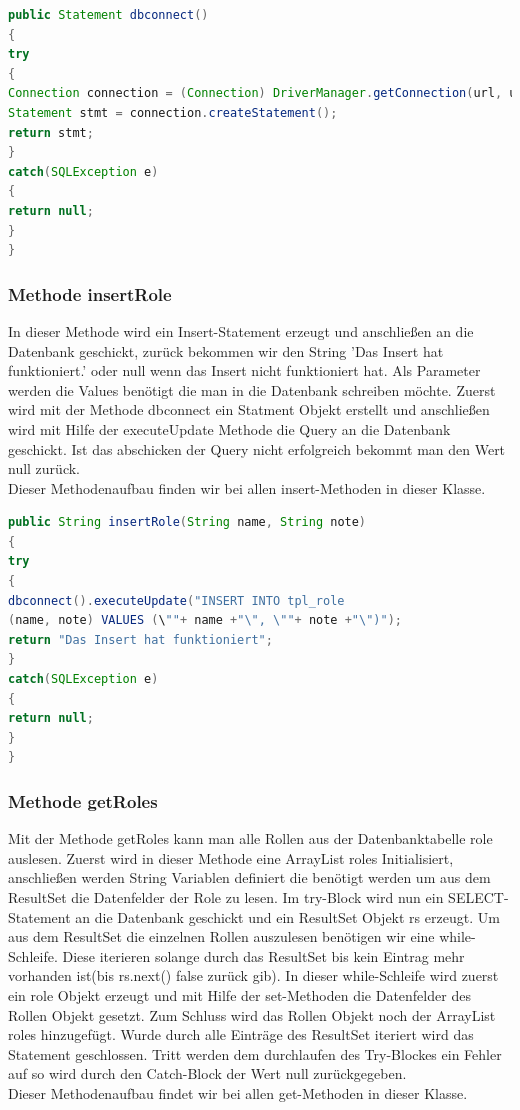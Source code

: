 \begin{lstlisting}[language=JAVA, caption=Datenbankanbindung.java/Methode-dbconnect, firstnumber=44]
public Statement dbconnect()
{   
try
{
Connection connection = (Connection) DriverManager.getConnection(url, username, password);
Statement stmt = connection.createStatement();
return stmt;
}
catch(SQLException e)
{
return null;
}
}
\end{lstlisting}

\newpage

\subsubsection{Methode insertRole\(\)}

In dieser Methode wird ein Insert-Statement erzeugt und anschließen an die Datenbank geschickt, zurück bekommen wir den String 'Das Insert hat funktioniert.' oder null wenn das Insert nicht funktioniert hat. Als Parameter werden die Values benötigt die man in die Datenbank schreiben möchte. Zuerst wird mit der Methode dbconnect\(\) ein Statment Objekt erstellt und anschließen wird mit Hilfe der executeUpdate Methode die Query an die Datenbank geschickt. Ist das abschicken der Query nicht erfolgreich bekommt man den Wert null zurück.\\
Dieser Methodenaufbau finden wir bei allen insert-Methoden in dieser Klasse.

\begin{lstlisting}[language=JAVA, caption=Datenbankanbindung.java/Methode-dbconnect, firstnumber=271]
public String insertRole(String name, String note)
{
try
{
dbconnect().executeUpdate("INSERT INTO tpl_role 
(name, note) VALUES (\""+ name +"\", \""+ note +"\")");
return "Das Insert hat funktioniert";
}
catch(SQLException e)
{
return null;
}
}
\end{lstlisting}
\newpage
\subsubsection{Methode getRoles\(\)}

Mit der Methode getRoles kann man alle Rollen aus der Datenbanktabelle role auslesen.
Zuerst wird in dieser Methode eine ArrayList roles Initialisiert, anschließen werden String Variablen definiert die benötigt werden um aus dem ResultSet die Datenfelder der Role zu lesen.
Im try-Block wird nun ein SELECT-Statement an die Datenbank geschickt und ein ResultSet Objekt rs erzeugt. 
Um aus dem ResultSet die einzelnen Rollen auszulesen benötigen wir eine while-Schleife. Diese iterieren solange durch das ResultSet bis kein Eintrag mehr vorhanden ist(bis rs.next() false zurück gib).
In dieser while-Schleife wird zuerst ein role Objekt erzeugt und mit Hilfe der set-Methoden die Datenfelder des Rollen Objekt gesetzt. Zum Schluss wird das Rollen Objekt noch der ArrayList roles hinzugefügt. Wurde durch alle Einträge des ResultSet iteriert wird das Statement geschlossen. Tritt werden dem durchlaufen des Try-Blockes ein Fehler auf so wird durch den Catch-Block der Wert null zurückgegeben.\\ 
Dieser Methodenaufbau findet wir bei allen get-Methoden in dieser Klasse.

